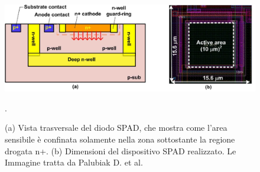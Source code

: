 \begin{figure}[tbh]
	\centering
	\includegraphics[width=0.8\linewidth]{./ImageFiles/cmos_2.jpg}
	\caption{(a) Vista trasversale del diodo SPAD, che mostra come l'area sensibile è confinata solamente nella zona sottostante la regione drogata n+. (b) Dimensioni del dispositivo SPAD realizzato. Le  Immagine tratta da Palubiak D. et al. \cite{Palubiak2011}}. 
	\label{fig:cmos_2}
\end{figure} 

